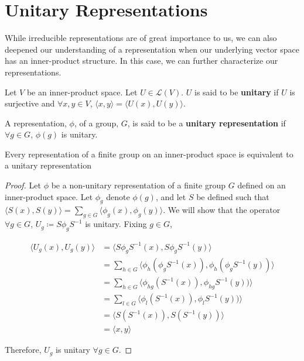 \section{Unitary Representations}

While irreducible representations are of great importance to us, we can also deepened our understanding of a representation when our underlying vector space has an inner-product structure. In this case, we can further characterize our representations. 

\begin{definition}
	Let $V$ be an inner-product space. Let $U \in \mathcal{L}(V)$. $U$ is said to be \textbf{unitary} if $U$ is surjective and $\forall x,y \in V$, $\langle x , y \rangle = \langle U(x) , U(y) \rangle$.
\end{definition}

\begin{definition}
	A representation, $\phi$, of a group, $G$, is said to be a \textbf{unitary representation} if $\forall g\in G$, $\phi(g)$ is unitary.
\end{definition}

\begin{theorem}
	Every representation of a finite group on an inner-product space is equivalent to a unitary representation
\end{theorem}

\begin{proof} Let $\phi$ be a non-unitary representation of a finite group $G$ defined on an inner-product space. Let $\phi_g$ denote $\phi(g)$, and let $S$ be defined such that $\langle S(x) , S(y) \rangle = \sum_{g \in G} \langle \phi_g (x) , \phi_g (y) \rangle$. We will show that the operator $\forall g \in G$, $U_g \coloneq S\phi_gS^{-1}$ is unitary. Fixing $g\in G$,


\begin{equation}
	\begin{aligned}
		\langle U_g(x) , U_g(y) \rangle &= \langle S\phi_gS^{-1}(x) , S\phi_gS^{-1}(y)\rangle \\
									&= \sum_{h \in G} \langle \phi_h(\phi_gS^{-1}(x)) , \phi_h(\phi_gS^{-1}(y))\rangle \\
									&= \sum_{h\in G} \langle \phi_{hg}(S^{-1}(x)) , \phi_{hg}S^{-1}(y))\rangle \\
									&= \sum_{l\in G} \langle \phi_{l}(S^{-1}(x)) , \phi_{l}S^{-1}(y))\rangle \\
									&= \langle S(S^{-1}(x)) , S(S^{-1}(y))\rangle \\
									&= \langle x , y \rangle 
	\end{aligned}
\end{equation}

Therefore, $U_g$ is unitary $\forall g \in G$. \end{proof}

